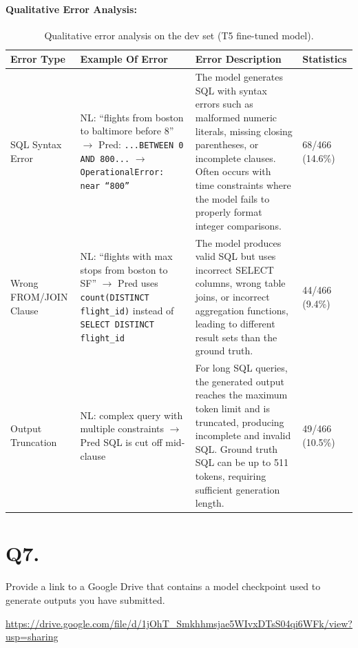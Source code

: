 \documentclass{article}
\begin{document}
\paragraph{Qualitative Error Analysis:}

\begin{table}[h!]
  \centering
  \begin{tabular}{p{2cm}p{3cm}p{3cm}p{5cm}}
    \toprule
    \textbf{Error Type}& \textbf{Example Of Error} & \textbf{Error Description} & \textbf{Statistics} \\
    \midrule
    SQL Syntax Error & NL: ``flights from boston to baltimore before 8'' $\to$ Pred: \texttt{...BETWEEN 0 AND 800...} $\to$ \texttt{OperationalError: near ``800''} & The model generates SQL with syntax errors such as malformed numeric literals, missing closing parentheses, or incomplete clauses. Often occurs with time constraints where the model fails to properly format integer comparisons. & 68/466 (14.6\%) \\
    \midrule
    Wrong FROM/JOIN Clause & NL: ``flights with max stops from boston to SF'' $\to$ Pred uses \texttt{count(DISTINCT flight\_id)} instead of \texttt{SELECT DISTINCT flight\_id} & The model produces valid SQL but uses incorrect SELECT columns, wrong table joins, or incorrect aggregation functions, leading to different result sets than the ground truth. & 44/466 (9.4\%) \\
    \midrule
    Output Truncation & NL: complex query with multiple constraints $\to$ Pred SQL is cut off mid-clause & For long SQL queries, the generated output reaches the maximum token limit and is truncated, producing incomplete and invalid SQL. Ground truth SQL can be up to 511 tokens, requiring sufficient generation length. & 49/466 (10.5\%) \\
  \end{tabular}
  \caption{Qualitative error analysis on the dev set (T5 fine-tuned model).}\label{tab:qualitative}
\end{table}


\section*{Q7.}

Provide a link to a Google Drive that contains a model checkpoint used to generate outputs you have submitted.

\url{https://drive.google.com/file/d/1jOhT_Smkhhmsjae5WIvxDTsS04qi6WFk/view?usp=sharing}
\end{document}

